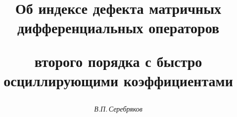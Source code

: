 

 




 


\newcommand{\tts}[1]{} 


 




 


\setcounter{page}{48} 












 


\author{\it В.П.\,Серебряков} 




\title{Об индексе дефекта матричных дифференциальных операторов  


второго порядка с быстро осциллирующими коэффициентами} 


 


\date{} 




\pagestyle{plain} %


 




\maketitle 


